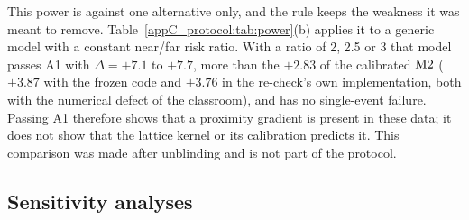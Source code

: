 This power is against one alternative only, and the rule keeps the weakness it was meant to remove.
Table~\ref{appC_protocol:tab:power}(b) applies it to a generic model with a constant near/far risk ratio. With
a ratio of 2, 2.5 or 3 that model passes A1 with $\Delta=+7.1$ to $+7.7$, more than the $+2.83$ of the
calibrated $\mathrm{M2}$ ($+3.87$ with the frozen code and $+3.76$ in the re-check's own implementation, both with
the numerical defect of the classroom), and has no single-event failure.
Passing A1 therefore shows that a proximity gradient is present in these data; it does not show that the
lattice kernel or its calibration predicts it. This comparison was made after unblinding and is not part of
the protocol.

\subsection{Sensitivity analyses}\label{appC_protocol:sec:sensitivity}

